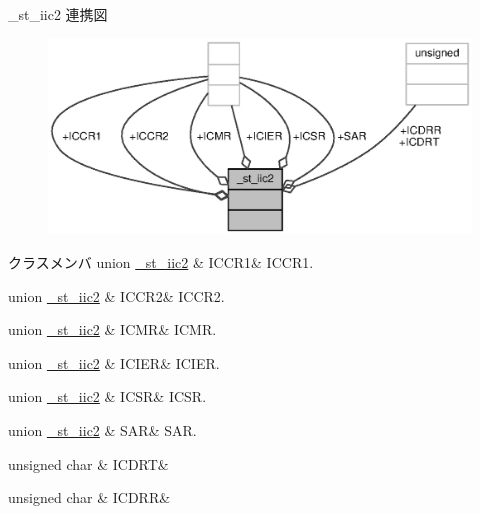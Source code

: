 \+\_\+st\+\_\+iic2 連携図
\nopagebreak
\begin{figure}[H]
\begin{center}
\leavevmode
\includegraphics[width=350pt]{d2/d78/struct__st__iic2__coll__graph}
\end{center}
\end{figure}
\begin{DoxyFields}{クラスメンバ}
union \hyperlink{3694s_8h_d7/d45/union__st__iic2_8ICCR1}{\+\_\+st\+\_\+iic2}\label{3694s_8h_a30c1372490fc62a34c62e5b5de03bbfc}
&
I\+C\+C\+R1&
I\+C\+C\+R1. \\
\hline

union \hyperlink{3694s_8h_d1/d93/union__st__iic2_8ICCR2}{\+\_\+st\+\_\+iic2}\label{3694s_8h_a77aa3f3e6f9fe2312828a215442d567e}
&
I\+C\+C\+R2&
I\+C\+C\+R2. \\
\hline

union \hyperlink{3694s_8h_d4/d53/union__st__iic2_8ICMR}{\+\_\+st\+\_\+iic2}\label{3694s_8h_ace0fe1d03c94faade9d6f61cae9ba697}
&
I\+C\+M\+R&
I\+C\+M\+R. \\
\hline

union \hyperlink{3694s_8h_de/df7/union__st__iic2_8ICIER}{\+\_\+st\+\_\+iic2}\label{3694s_8h_af015b0f7622e9d725823b07f4d5f7955}
&
I\+C\+I\+E\+R&
I\+C\+I\+E\+R. \\
\hline

union \hyperlink{3694s_8h_dd/d85/union__st__iic2_8ICSR}{\+\_\+st\+\_\+iic2}\label{3694s_8h_a04555e11720d7b68b7904163f48d4469}
&
I\+C\+S\+R&
I\+C\+S\+R. \\
\hline

union \hyperlink{3694s_8h_d1/d9d/union__st__iic2_8SAR}{\+\_\+st\+\_\+iic2}\label{3694s_8h_a70e0fb2378b0f4d38235058de683bd68}
&
S\+A\+R&
S\+A\+R. \\
\hline

unsigned char\label{3694s_8h_a0f0d89e9cd2eea14ef4ccb4bf3400d2f}
&
I\+C\+D\+R\+T&
\\
\hline

unsigned char\label{3694s_8h_a99b2663c57880687f88c5e9a3ab394e7}
&
I\+C\+D\+R\+R&
\\
\hline

\end{DoxyFields}
\label{struct__st__tw}
